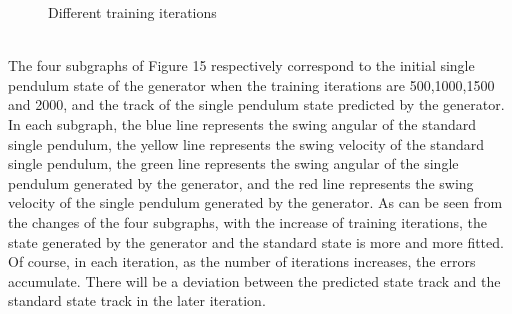 \documentclass[11pt,a4paper]{article}
\begin{document}
\begin{figure}[ht!]
\centering
{}
\quad
{}
\quad
{}
\quad
{}
\caption{Different training iterations}
\label{fig: Different training iterations}
\end{figure}
\\
The four subgraphs of Figure 15 respectively correspond to the initial single pendulum state of the generator when the training iterations are 500,1000,1500 and 2000, and the track of the single pendulum state predicted by the generator. In each subgraph, the blue line represents the swing angular of the standard single pendulum, the yellow line represents the swing velocity of the standard single pendulum, the green line represents the swing angular of the single pendulum generated by the generator, and the red line represents the swing velocity of the single pendulum generated by the generator. As can be seen from the changes of the four subgraphs, with the increase of training iterations, the state generated by the generator and the standard state is more and more fitted. Of course, in each iteration, as the number of iterations increases, the errors accumulate. There will be a deviation between the predicted state track and the standard state track in the later iteration.
\end{document}
